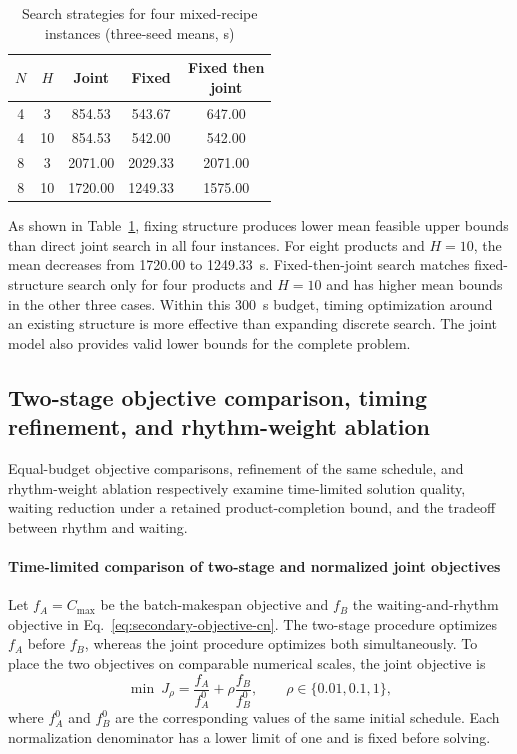 \documentclass[final,5p,times,twocolumn]{elsarticle}
\begin{document}
\begin{table}[!htbp]
\centering\small
\caption{Search strategies for four mixed-recipe instances (three-seed means, s)}
\label{tab:structure-ablation-cn}
\begin{tabular}{ccccc}\toprule
$N$ & $H$ & Joint & Fixed & \makecell[c]{Fixed then\\joint}\\\midrule
4 & 3 & 854.53 & 543.67 & 647.00\\
4 & 10 & 854.53 & 542.00 & 542.00\\
8 & 3 & 2071.00 & 2029.33 & 2071.00\\
8 & 10 & 1720.00 & 1249.33 & 1575.00\\
\bottomrule\end{tabular}
\end{table}


As shown in Table~\ref{tab:structure-ablation-cn}, fixing structure produces lower mean feasible upper bounds than direct joint search in all four instances. For eight products and $H=10$, the mean decreases from 1720.00 to 1249.33~s. Fixed-then-joint search matches fixed-structure search only for four products and $H=10$ and has higher mean bounds in the other three cases. Within this 300~s budget, timing optimization around an existing structure is more effective than expanding discrete search. The joint model also provides valid lower bounds for the complete problem.

\subsection{Two-stage objective comparison, timing refinement, and rhythm-weight ablation}
\label{sec:stage2-validation-cn}
Equal-budget objective comparisons, refinement of the same schedule, and rhythm-weight ablation respectively examine time-limited solution quality, waiting reduction under a retained product-completion bound, and the tradeoff between rhythm and waiting.

\paragraph{Time-limited comparison of two-stage and normalized joint objectives}
Let $f_A=C_{\max}$ be the batch-makespan objective and $f_B$ the waiting-and-rhythm objective in Eq.~\eqref{eq:secondary-objective-cn}. The two-stage procedure optimizes $f_A$ before $f_B$, whereas the joint procedure optimizes both simultaneously. To place the two objectives on comparable numerical scales, the joint objective is
\[
\min\ J_\rho=\frac{f_A}{f_A^0}+\rho\frac{f_B}{f_B^0},
\qquad \rho\in\{0.01,0.1,1\},
\]
where $f_A^0$ and $f_B^0$ are the corresponding values of the same initial schedule. Each normalization denominator has a lower limit of one and is fixed before solving.
\end{document}
